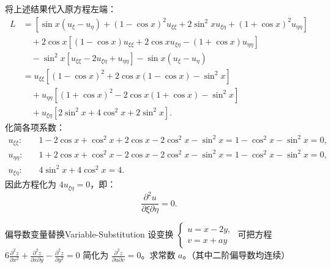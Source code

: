 \begin{myproof}
    将上述结果代入原方程左端：
    \begin{equation}
        \begin{aligned}
            L & = \left[ \sin x (u_\xi - u_\eta) + (1 - \cos x)^2 u_{\xi\xi} + 2\sin^2 x u_{\xi\eta} + (1 + \cos x)^2 u_{\eta\eta} \right] \\
              & \quad + 2\cos x \left[ (1 - \cos x) u_{\xi\xi} + 2\cos x u_{\xi\eta} - (1 + \cos x) u_{\eta\eta} \right]                   \\
              & \quad - \sin^2 x \left[ u_{\xi\xi} - 2u_{\xi\eta} + u_{\eta\eta} \right] - \sin x (u_\xi - u_\eta)                         \\
              & = u_{\xi\xi} \left[ (1 - \cos x)^2 + 2\cos x (1 - \cos x) - \sin^2 x \right]                                               \\
              & \quad + u_{\eta\eta} \left[ (1 + \cos x)^2 - 2\cos x (1 + \cos x) - \sin^2 x \right]                                       \\
              & \quad + u_{\xi\eta} \left[ 2\sin^2 x + 4\cos^2 x + 2\sin^2 x \right].
        \end{aligned}
    \end{equation}
    化简各项系数：
    \begin{equation}
        \begin{aligned}
            u_{\xi\xi}: \quad   & 1 - 2\cos x + \cos^2 x + 2\cos x - 2\cos^2 x - \sin^2 x = 1 - \cos^2 x - \sin^2 x = 0, \\
            u_{\eta\eta}: \quad & 1 + 2\cos x + \cos^2 x - 2\cos x - 2\cos^2 x - \sin^2 x = 1 - \cos^2 x - \sin^2 x = 0, \\
            u_{\xi\eta}: \quad  & 4\sin^2 x + 4\cos^2 x = 4.
        \end{aligned}
    \end{equation}
    因此方程化为 $4 u_{\xi\eta} = 0$，即：
    \begin{equation}
        \frac{\partial^2 u}{\partial \xi \partial \eta} = 0.
    \end{equation}
\end{myproof}


\begin{problem}{偏导数变量替换}{Variable-Substitution}
    设变换 $\begin{cases} u = x - 2y, \\ v = x + ay \end{cases}$ 可把方程 $6 \frac{\partial^2 z}{\partial x^2} + \frac{\partial^2 z}{\partial x \partial y} - \frac{\partial^2 z}{\partial y^2} = 0$ 简化为 $\frac{\partial^2 z}{\partial u \partial v} = 0$。求常数 $a$。（其中二阶偏导数均连续）
\end{problem}

